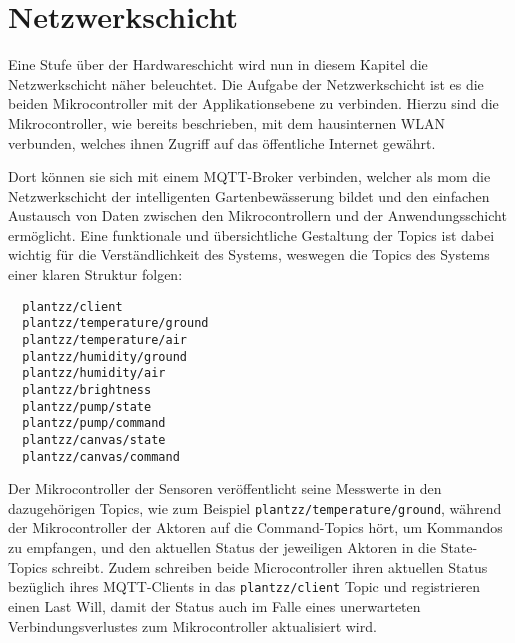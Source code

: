 
\section{Netzwerkschicht}

Eine Stufe über der Hardwareschicht wird nun in diesem Kapitel die Netzwerkschicht näher beleuchtet.
Die Aufgabe der Netzwerkschicht ist es die beiden Mikrocontroller mit der Applikationsebene zu verbinden.
Hierzu sind die Mikrocontroller, wie bereits beschrieben, mit dem hausinternen WLAN verbunden, welches ihnen Zugriff auf das öffentliche Internet gewährt.

Dort können sie sich mit einem MQTT-Broker verbinden, welcher als \gls{mom} die Netzwerkschicht der intelligenten Gartenbewässerung bildet und den einfachen Austausch von Daten zwischen den Mikrocontrollern und der Anwendungsschicht ermöglicht.
Eine funktionale und übersichtliche Gestaltung der Topics ist dabei wichtig für die Verständlichkeit des Systems, weswegen die Topics des Systems einer klaren Struktur folgen:

\begin{verbatim}
  plantzz/client
  plantzz/temperature/ground
  plantzz/temperature/air
  plantzz/humidity/ground
  plantzz/humidity/air
  plantzz/brightness
  plantzz/pump/state
  plantzz/pump/command
  plantzz/canvas/state
  plantzz/canvas/command
\end{verbatim}

Der Mikrocontroller der Sensoren veröffentlicht seine Messwerte in den dazugehörigen Topics, wie zum Beispiel \texttt{plantzz/temperature/ground}, während der Mikrocontroller der Aktoren auf die Command-Topics hört, um Kommandos zu empfangen, und den aktuellen Status der jeweiligen Aktoren in die State-Topics schreibt.
Zudem schreiben beide Microcontroller ihren aktuellen Status bezüglich ihres MQTT-Clients in das \texttt{plantzz/client} Topic und registrieren einen Last Will, damit der Status auch im Falle eines unerwarteten Verbindungsverlustes zum Mikrocontroller aktualisiert wird.
